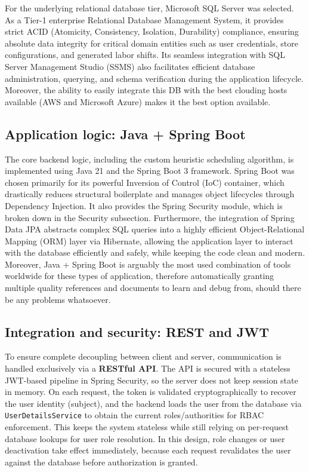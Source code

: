 \par For the underlying relational database tier, Microsoft SQL Server was selected. As a Tier-1 enterprise Relational Database Management System, it provides strict ACID (Atomicity, Consistency, Isolation, Durability) compliance, ensuring absolute data integrity for critical domain entities such as user credentials, store configurations, and generated labor shifts. Its seamless integration with SQL Server Management Studio (SSMS) also facilitates efficient database administration, querying, and schema verification during the application lifecycle. Moreover, the ability to easily integrate this DB with the best clouding hosts available (AWS and Microsoft Azure) makes it the best option available. \cite{pass2025}

\subsection{Application logic: Java + Spring Boot}
\label{subsec:ch3sec1subsec2}

\par The core backend logic, including the custom heuristic scheduling algorithm, is implemented using Java 21 and the Spring Boot 3 framework. Spring Boot was chosen primarily for its powerful Inversion of Control (IoC) container, which drastically reduces structural boilerplate and manages object lifecycles through Dependency Injection. It also provides the Spring Security module, which is broken down in the Security subsection. Furthermore, the integration of Spring Data JPA abstracts complex SQL queries into a highly efficient Object-Relational Mapping (ORM) layer via Hibernate, allowing the application layer to interact with the database efficiently and safely, while keeping the code clean and modern. Moreover, Java + Spring Boot is arguably the most used combination of tools worldwide for these types of application, therefore automatically granting multiple quality references and documents to learn and debug from, should there be any problems whatsoever.\cite{GuideOnJavaAndSpringBoot}

\subsection{Integration and security: REST and JWT}
\label{subsec:ch3sec1subsec3}

\par To ensure complete decoupling between client and server, communication is handled exclusively via a \textbf{RESTful API}. The API is secured with a stateless JWT-based pipeline in Spring Security, so the server does not keep session state in memory. On each request, the token is validated cryptographically to recover the user identity (subject), and the backend loads the user from the database via \texttt{UserDetailsService} to obtain the current roles/authorities for RBAC enforcement. This keeps the system stateless while still relying on per-request database lookups for user role resolution. In this design, role changes or user deactivation take effect immediately, because each request revalidates the user against the database before authorization is granted. \cite{mario2025hybrid}

